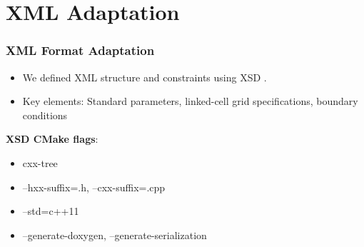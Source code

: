 
\section{XML Adaptation}
\label{sec:xml}

\begin{frame}
    \frametitle{XML Format Adaptation}

    \begin{itemize}
        \item We defined XML structure and constraints using XSD .
        \item Key elements: Standard parameters, linked-cell grid specifications, boundary conditions
    \end{itemize}

    \textbf{XSD CMake flags}:
    \begin{itemize}
        \item cxx-tree
        \item --hxx-suffix=.h, --cxx-suffix=.cpp
        \item --std=c++11
        \item --generate-doxygen, --generate-serialization
    \end{itemize}
\end{frame}

